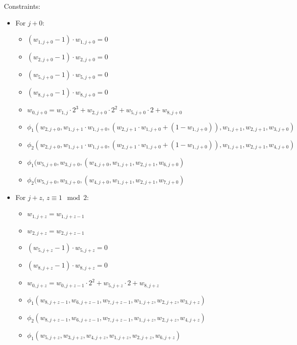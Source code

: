 Constraints:
\begin{itemize}
    \item For $j + 0$:
        \begin{itemize}
        	 \item $(w_{1, j + 0} - 1) \cdot w_{1, j + 0} = 0$ 
        	 \item $(w_{2, j + 0} - 1) \cdot w_{2, j + 0} = 0$
        	 \item $(w_{5, j + 0} - 1) \cdot w_{5, j + 0} = 0$ 
        	 \item $(w_{8, j + 0} - 1) \cdot w_{8, j + 0} = 0$ 
            \item $w_{0, j + 0} = w_{1, j} \cdot 2^3 + w_{2, j + 0} \cdot 2^2 + w_{5, j + 0} \cdot 2 + w_{8, j + 0}$
            \item $\phi_1(w_{2, j + 0}, w_{1, j + 1} \cdot w_{1, j + 0}, (w_{2, j + 1} \cdot w_{1, j + 0} + (1 - w_{1, j + 0})), w_{1, j + 1}, w_{2, j + 1}, w_{3, j + 0})$
            \item $\phi_2(w_{2, j + 0}, w_{1, j + 1} \cdot w_{1, j + 0}, (w_{2, j + 1} \cdot w_{1, j + 0} + (1 - w_{1, j + 0})), w_{1, j + 1}, w_{2, j + 1}, w_{4, j + 0})$
            \item $\phi_1(w_{5, j + 0}, w_{3, j + 0}, (w_{4, j + 0}, w_{1, j + 1}, w_{2, j + 1}, w_{6, j + 0})$
            \item $\phi_2(w_{5, j + 0}, w_{3, j + 0}, (w_{4, j + 0}, w_{1, j + 1}, w_{2, j + 1}, w_{7, j + 0})$
        \end{itemize}
    \item For $j + z$, $z \equiv 1 \mod 2$:
        \begin{itemize}
        	\item $w_{1, j + z} = w_{1, j + z - 1}$
        	\item $w_{2, j + z} = w_{2, j + z - 1}$
        	 \item $(w_{5, j + z} - 1) \cdot w_{5, j + z} = 0$
        	 \item $(w_{8, j + z} - 1) \cdot w_{8, j + z} = 0$
            \item $w_{0, j + z} = w_{0, j + z - 1} \cdot 2^2 + w_{5, j + z} \cdot 2 + w_{8, j + z}$
            \item $\phi_1(w_{8, j + z - 1}, w_{6, j + z - 1}, w_{7, j + z - 1}, w_{1, j + z}, w_{2, j + z}, w_{3, j + z})$
            \item $\phi_2(w_{8, j + z - 1}, w_{6, j + z - 1}, w_{7, j + z - 1}, w_{1, j + z}, w_{2, j + z}, w_{4, j + z})$
            \item $\phi_1(w_{5, j + z}, w_{3, j + z}, w_{4, j + z}, w_{1, j + z}, w_{2, j + z}, w_{6, j + z})$

\end{itemize}
\end{itemize}
